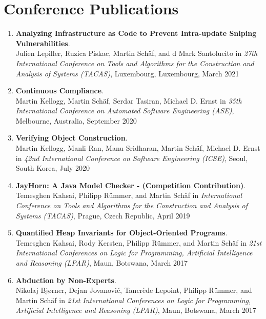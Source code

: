 \section{\sc Conference Publications}


\begin{enumerate}


\item \textbf{Analyzing Infrastructure as Code to Prevent Intra-update Sniping Vulnerabilities}.
\\ Julien Lepiller, Ruzica Piskac, Martin Sch\"af, and d Mark Santolucito in 
\emph{27th International Conference on Tools and Algorithms for the Construction and Analysis of Systems (TACAS)},
Luxembourg, Luxembourg, March 2021

\item \textbf{Continuous Compliance}.
\\ Martin Kellogg, Martin Sch\"af, Serdar Tasiran, Michael D. Ernst in 
\emph{35th International Conference on Automated Software Engineering (ASE)},
Melbourne, Australia, September 2020

\item \textbf{Verifying Object Construction}.
\\ Martin Kellogg, Manli Ran, Manu Sridharan, Martin Sch\"af, Michael D. Ernst in 
\emph{42nd International Conference on Software Engineering (ICSE)},
Seoul, South Korea, July 2020

\item \textbf{JayHorn: A Java Model Checker - (Competition Contribution)}.
\\ Temesghen Kahsai, Philipp R\"ummer, and Martin Sch\"af in 
\emph{International Conference on Tools and Algorithms for the Construction and Analysis of Systems (TACAS)},
Prague, Czech Republic, April 2019

\item \textbf{Quantified Heap Invariants for Object-Oriented Programs}.
\\ Temesghen Kahsai, Rody Kersten, Philipp R\"ummer, and Martin Sch\"af in 
\emph{21st International Conferences on Logic for Programming, Artificial Intelligence and Reasoning (LPAR)},
Maun, Botswana, March 2017

\item \textbf{Abduction by Non-Experts}.
\\ Nikolaj Bj{\o}rner, Dejan Jovanovi\'c, Tancr\`ede Lepoint, Philipp R\"ummer, and Martin Sch\"af in 
\emph{21st International Conferences on Logic for Programming, Artificial Intelligence and Reasoning (LPAR)},
Maun, Botswana, March 2017



\end{enumerate}
